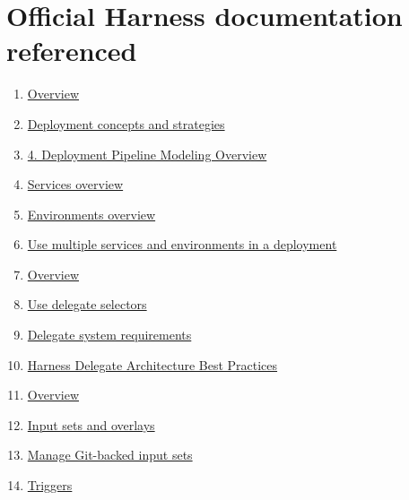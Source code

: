 \documentclass[11pt]{article}
\begin{document}
\section*{Official Harness documentation referenced}
{\small
\begin{enumerate}[leftmargin=1.5em,itemsep=0.2em]
  \item \href{https://developer.harness.io/docs/continuous-delivery/overview}{Overview}
  \item \href{https://developer.harness.io/docs/continuous-delivery/manage-deployments/deployment-concepts}{Deployment concepts and strategies}
  \item \href{https://developer.harness.io/docs/continuous-delivery/cd-onboarding/new-user/cd-pipeline-modeling-overview}{4. Deployment Pipeline Modeling Overview}
  \item \href{https://developer.harness.io/docs/continuous-delivery/x-platform-cd-features/services/services-overview}{Services overview}
  \item \href{https://developer.harness.io/docs/continuous-delivery/x-platform-cd-features/environments/environment-overview}{Environments overview}
  \item \href{https://developer.harness.io/docs/continuous-delivery/x-platform-cd-features/advanced/multiserv-multienv/}{Use multiple services and environments in a deployment}
  \item \href{https://developer.harness.io/docs/platform/delegates/delegate-concepts/delegate-overview/}{Overview}
  \item \href{https://developer.harness.io/docs/platform/delegates/manage-delegates/select-delegates-with-selectors}{Use delegate selectors}
  \item \href{https://developer.harness.io/docs/platform/delegates/delegate-concepts/delegate-requirements}{Delegate system requirements}
  \item \href{https://developer.harness.io/docs/platform/reference-architectures/delegate-architecture-bestpractices}{Harness Delegate Architecture Best Practices}
  \item \href{https://developer.harness.io/docs/platform/get-started/overview/}{Overview}
  \item \href{https://developer.harness.io/docs/platform/pipelines/input-sets}{Input sets and overlays}
  \item \href{https://developer.harness.io/docs/platform/git-experience/manage-input-sets-in-simplified-git-experience}{Manage Git-backed input sets}
  \item \href{https://developer.harness.io/docs/category/triggers/}{Triggers}

\end{enumerate}}
\end{document}
